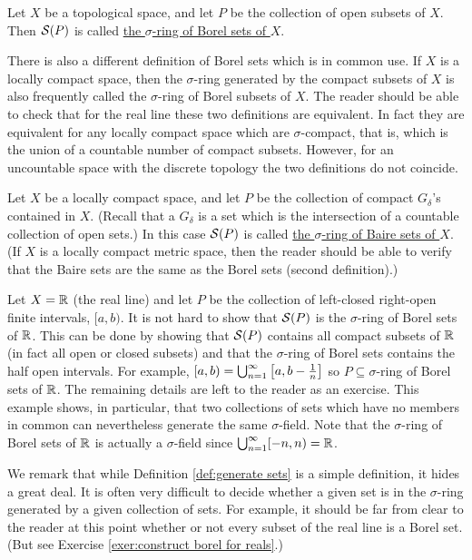\begin{example}
Let $X$ be a topological space, and let $P$ be the collection of open subsets of $X$. Then ${\cal S}(P)$ is called \underline{the $\sigma$-ring of Borel sets of $X$}.
\end{example}

There is also a different definition of Borel sets which is in common use. If $X$ is a locally compact space, then the $\sigma$-ring generated by the compact subsets of $X$ is also frequently called the $\sigma$-ring of Borel subsets of $X$. The reader should be able to check that for the real line these two definitions are equivalent. In fact they are equivalent for any locally compact space which are $\sigma$-compact, that is, which is the union of a countable number of compact subsets. However, for an uncountable space with the discrete topology the two definitions do not coincide.

\begin{example}
Let $X$ be a locally compact space, and let $P$ be the collection of compact $G_\delta$'s contained in $X$. (Recall that a $G_\delta$ is a set which is the intersection of a countable collection of open sets.) In this case ${\cal S}(P)$ is called \underline{the $\sigma$-ring of Baire sets of $X$}. (If $X$ is a locally compact metric space, then the reader should be able to verify that the Baire sets are the same as the Borel sets (second definition).)
\end{example}

\begin{example}
\label{ex:borel for reals}
Let $X=\mathbb{R}$ (the real line) and let $P$ be the collection of left-closed right-open finite intervals, $[a,b)$. It is not hard to show that ${\cal S}(P)$ is the $\sigma$-ring of Borel sets of $\mathbb{R}$. This can be done by showing that ${\cal S}(P)$ contains all compact subsets of $\mathbb{R}$ (in fact all open or closed subsets) and that the $\sigma$-ring of Borel sets contains the half open intervals. For example, $[a,b)=\bigcup_{n=1}^\infty\left[a,b-\frac1n\right]$ so $P\subseteq\sigma$-ring of Borel sets of $\mathbb{R}$. The remaining details are left to the reader as an exercise. This example shows, in particular, that two collections of sets which have no members in common can nevertheless generate the same $\sigma$-field. Note that the $\sigma$-ring of Borel sets of $\mathbb{R}$ is actually a $\sigma$-field since $\bigcup_{n=1}^\infty[-n,n)=\mathbb{R}$.
\end{example}

We remark that while Definition \ref{def:generate sets} is a simple definition, it hides a great deal. It is often very difficult to decide whether a given set is in the $\sigma$-ring generated by a given collection of sets. For example, it should be far from clear to the reader at this point whether or not every subset of the real line is a Borel set. (But see Exercise \ref{exer:construct borel for reals}.)


